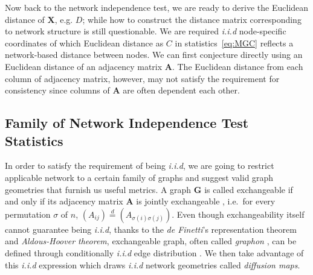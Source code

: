 \documentclass[11pt]{article}
\theoremstyle{definition}
\begin{document}
Now back to the network independence test, we are ready to derive the Euclidean distance of $\mathbf{X}$, e.g. $D$; while how to construct the distance matrix corresponding to network structure is still questionable. We are required \textit{i.i.d} node-specific coordinates of which Euclidean distance as $C$ in statistics~\ref{eq:MGC} reflects a network-based distance between nodes. We can first conjecture directly using an Euclidean distance of an adjacency matrix $\mathbf{A}$. The Euclidean distance from each column of adjacency matrix, however, may not satisfy the requirement for consistency since columns of $\mathbf{A}$ are often dependent each other.
	
	\vspace*{-0.2cm}
\subsection{Family of Network Independence Test Statistics}
\label{ssec:method2}

In order to satisfy the requirement of being \textit{i.i.d}, we are going to restrict applicable network to a certain family of graphs and suggest valid graph geometries that furnish us useful metrics. A graph $\mathbf{G}$ is called exchangeable if and only if its adjacency matrix $\mathbf{A}$ is jointly exchangeable \citep{orbanz2015bayesian}, i.e.~for every permutation $\sigma$ of $n$, $(A_{ij}) \stackrel{d}{=} (A_{\sigma(i) \sigma(j)})$. Even though exchangeability itself cannot guarantee being \textit{i.i.d}, thanks to the \textit{de Finetti}'s representation theorem and \textit{Aldous-Hoover theorem}, exchangeable graph, often called \textit{graphon} \citep{lovasz2006limits}, can be defined through conditionally \textit{i.i.d} edge distribution \citep{chan2013estimation}. We then take advantage of this \textit{i.i.d} expression which draws \textit{i.i.d} network geometries called \textit{diffusion maps}.
\end{document}
